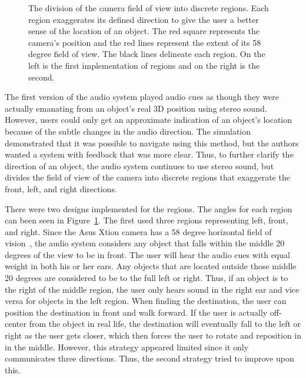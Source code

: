 \begin{figure}
\caption{The division of the camera field of view into discrete regions. Each
region exaggerates its defined direction to give the user a better sense of the
location of an object. The red square represents the camera's position and the
red lines represent the extent of its 58 degree field of view. The black lines
delineate each region. On the left is the first implementation of regions and
on the right is the second.}
\label{fig:regions}
\end{figure}

The first version of the audio system played audio cues as though they were
actually emanating from an object's real 3D position using stereo sound. However,
users could only get an approximate indication of an object's location because
of the subtle changes in the audio direction. The simulation demonstrated that
it was possible to navigate using this method, but the authors wanted a system
with feedback that was more clear. Thus, to further clarify the direction of an 
object, the audio system continues to use stereo sound, but divides the field of
view of the camera into discrete regions that exaggerate the front, left, and 
right directions.

There were two designs implemented for the regions. The angles for each region 
can been seen in Figure~\ref{fig:regions}. The first used three regions 
representing left, front, and right. Since the Asus Xtion camera has a 58 degree 
horizontal field of vision~\cite{xtion-website}, the audio system considers any 
object that falls within the middle 20 degrees of the view to be in front. The 
user will hear the audio cues with equal weight in both his or her ears. Any 
objects that are located outside those middle 20 degrees are considered to be to 
the full left or right. Thus, if an object is to the right of the middle region, 
the user only hears sound in the right ear and vice versa for objects in the 
left region. When finding the destination, the user can position the destination 
in front and walk forward. If the user is actually off-center from the object in 
real life, the destination will eventually fall to the left or right as the user 
gets closer, which then forces the user to rotate and reposition in in the 
middle. However, this strategy appeared limited since it only communicates 
three directions. Thus, the second strategy tried to improve upon this.

